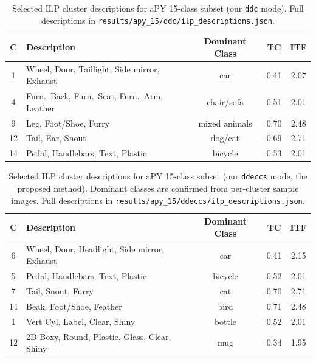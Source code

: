 \begin{table}[H]
    \centering
    \caption{Selected ILP cluster descriptions for aPY 15-class subset (our \texttt{ddc} mode). Full descriptions in \texttt{results/apy\_15/ddc/ilp\_descriptions.json}.}
    \label{tab:apy15_descriptions}
    \begin{tabular}{clccc}
        \hline
        \textbf{C} & \textbf{Description} & \textbf{Dominant Class} & \textbf{TC} & \textbf{ITF} \\
        \hline
        1 & Wheel, Door, Taillight, Side mirror, Exhaust & car & 0.41 & 2.07 \\
        4 & Furn.\ Back, Furn.\ Seat, Furn.\ Arm, Leather & chair/sofa & 0.51 & 2.01 \\
        9 & Leg, Foot/Shoe, Furry & mixed animals & 0.70 & 2.48 \\
        12 & Tail, Ear, Snout & dog/cat & 0.69 & 2.71 \\
        14 & Pedal, Handlebars, Text, Plastic & bicycle & 0.53 & 2.01 \\
        \hline
    \end{tabular}
\end{table}


\begin{table}[H]
    \centering
    \caption[Selected ILP cluster descriptions for aPY 15-class subset (\texttt{ddeccs} mode)]{Selected ILP cluster descriptions for aPY 15-class subset (our \texttt{ddeccs} mode, the proposed method). Dominant classes are confirmed from per-cluster sample images. Full descriptions in \texttt{results/apy\_15/ddeccs/ilp\_descriptions.json}.}
    \label{tab:apy15_descriptions_ddeccs}
    \begin{tabular}{clccc}
        \hline
        \textbf{C} & \textbf{Description} & \textbf{Dominant Class} & \textbf{TC} & \textbf{ITF} \\
        \hline
        6 & Wheel, Door, Headlight, Side mirror, Exhaust & car & 0.41 & 2.15 \\
        5 & Pedal, Handlebars, Text, Plastic & bicycle & 0.52 & 2.01 \\
        7 & Tail, Snout, Furry & cat & 0.70 & 2.71 \\
        14 & Beak, Foot/Shoe, Feather & bird & 0.71 & 2.48 \\
        1 & Vert Cyl, Label, Clear, Shiny & bottle & 0.52 & 2.01 \\
        12 & 2D Boxy, Round, Plastic, Glass, Clear, Shiny & mug & 0.34 & 1.95 \\
        \hline
    \end{tabular}
\end{table}

